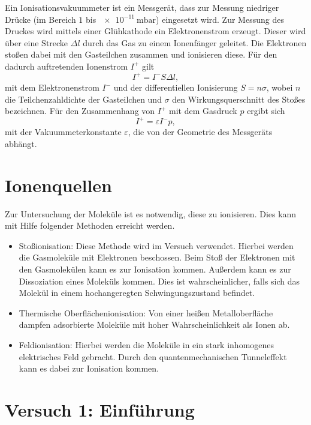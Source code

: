 Ein Ionisationsvakuummeter ist ein Messgerät, dass zur Messung niedriger Drücke (im Bereich $1$ bis $\SI{e-11}{\milli\bar}$) eingesetzt wird. Zur Messung des Druckes wird mittels einer Glühkathode ein Elektronenstrom erzeugt. Dieser wird über eine Strecke $\Delta l$ durch das Gas zu einem Ionenfänger geleitet.
Die Elektronen stoßen dabei mit den Gasteilchen zusammen und ionisieren diese. Für den dadurch auftretenden Ionenstrom $I^{+}$ gilt
\begin{equation}
 I^{+} = I^{-}S\Delta l,
\end{equation}
mit dem Elektronenstrom $I^{-}$ und der differentiellen Ionisierung $S=n\sigma$, wobei $n$ die Teilchenzahldichte der Gasteilchen und $\sigma$ den Wirkungsquerschnitt des Stoßes bezeichnen.
Für den Zusammenhang von $I^{+}$ mit dem Gasdruck $p$ ergibt sich
\begin{equation}
 I^{+} = \varepsilon I^{-}p,
\end{equation}
mit der Vakuummeterkonstante $\varepsilon$, die von der Geometrie des Messgeräts abhängt.

\section{Ionenquellen}

Zur Untersuchung der Moleküle ist es notwendig, diese zu ionisieren. Dies kann mit Hilfe folgender Methoden erreicht werden.
\begin{itemize}
 \item Stoßionisation: Diese Methode wird im Versuch verwendet. Hierbei werden die Gasmoleküle mit Elektronen beschossen. Beim Stoß der Elektronen mit den Gasmolekülen kann es zur Ionisation kommen.
 Außerdem kann es zur Dissoziation eines Moleküls kommen. Dies ist wahrscheinlicher, falls sich das Molekül in einem hochangeregten Schwingungszustand befindet.
 \item Thermische Oberflächenionisation: Von einer heißen Metalloberfläche dampfen adsorbierte Moleküle mit hoher Wahrscheinlichkeit als Ionen ab.
 \item Feldionisation: Hierbei werden die Moleküle in ein stark inhomogenes elektrisches Feld gebracht. Durch den quantenmechanischen Tunneleffekt kann es dabei zur Ionisation kommen.
\end{itemize}


\section{Versuch 1: Einführung}

